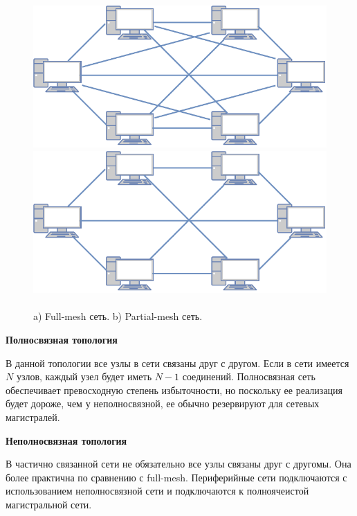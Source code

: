 \documentclass[a4paper]{article}
\begin{document}
\begin{figure}[H]
	\begin{minipage}[h]{0.45\linewidth}
	\includegraphics[width=1\linewidth]{full.pdf}
	\end{minipage}
	\hfill 
	\begin{minipage}[h]{0.43\linewidth}
	\includegraphics[width=1\linewidth]{partial.pdf}
	\end{minipage}
    \caption{\\a) \;Full-mesh сеть. b)\; Partial-mesh сеть.}
    \label{p2}
\end{figure}

\textbf{Полноcвязная топология} \par

В данной топологии все узлы в сети связаны друг с другом. Если в сети имеется $N$ узлов, каждый узел будет иметь $N-1$ соединений.
 Полносвязная сеть обеспечивает превосходную степень избыточности, но поскольку ее реализация будет дороже, чем у неполносвязной, ее обычно резервируют для сетевых магистралей.
 
\textbf{Неполносвязная топология}

В частично связанной сети не обязательно все узлы связаны друг с другомы. Она более практична по сравнению с full-mesh. 
Периферийные сети подключаются с использованием неполносвязной сети и подключаются к полноячеистой магистральной сети.
\end{document}
